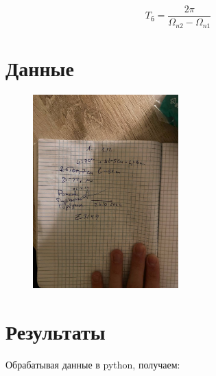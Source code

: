 \documentclass[a4paper]{article}
\begin{document}
\[
    T_{\text{б}}=\dfrac{2\pi}{\Omega_{n2}-\Omega_{n1}}
\]

\section{\textbf{Данные}}
\begin{figure}[H]
\includegraphics[width=0.5\textwidth]{pick_me}
\end{figure}


\section{\textbf{Результаты}}
Обрабатывая данные в python, получаем:
\end{document}
